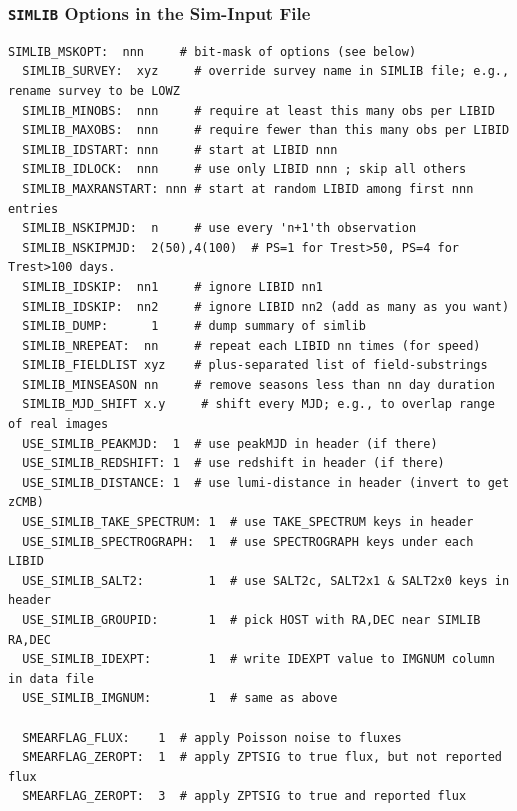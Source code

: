 \documentclass[12pt]{article}
\newcommand{\simlib}{{\tt SIMLIB}}
\begin{document}
{%
\clearpage
\subsubsection{{\simlib} Options in the Sim-Input File}
\label{sssec:simlib_options}

\begin{Verbatim}[frame=single]
  SIMLIB_MSKOPT:  nnn     # bit-mask of options (see below)
  SIMLIB_SURVEY:  xyz     # override survey name in SIMLIB file; e.g., rename survey to be LOWZ
  SIMLIB_MINOBS:  nnn     # require at least this many obs per LIBID
  SIMLIB_MAXOBS:  nnn     # require fewer than this many obs per LIBID
  SIMLIB_IDSTART: nnn     # start at LIBID nnn
  SIMLIB_IDLOCK:  nnn     # use only LIBID nnn ; skip all others
  SIMLIB_MAXRANSTART: nnn # start at random LIBID among first nnn entries
  SIMLIB_NSKIPMJD:  n     # use every 'n+1'th observation
  SIMLIB_NSKIPMJD:  2(50),4(100)  # PS=1 for Trest>50, PS=4 for Trest>100 days.
  SIMLIB_IDSKIP:  nn1     # ignore LIBID nn1
  SIMLIB_IDSKIP:  nn2     # ignore LIBID nn2 (add as many as you want)  
  SIMLIB_DUMP:      1     # dump summary of simlib 
  SIMLIB_NREPEAT:  nn     # repeat each LIBID nn times (for speed)
  SIMLIB_FIELDLIST xyz    # plus-separated list of field-substrings
  SIMLIB_MINSEASON nn     # remove seasons less than nn day duration
  SIMLIB_MJD_SHIFT x.y     # shift every MJD; e.g., to overlap range of real images
  USE_SIMLIB_PEAKMJD:  1  # use peakMJD in header (if there)
  USE_SIMLIB_REDSHIFT: 1  # use redshift in header (if there)
  USE_SIMLIB_DISTANCE: 1  # use lumi-distance in header (invert to get zCMB)
  USE_SIMLIB_TAKE_SPECTRUM: 1  # use TAKE_SPECTRUM keys in header 
  USE_SIMLIB_SPECTROGRAPH:  1  # use SPECTROGRAPH keys under each LIBID
  USE_SIMLIB_SALT2:         1  # use SALT2c, SALT2x1 & SALT2x0 keys in header
  USE_SIMLIB_GROUPID:       1  # pick HOST with RA,DEC near SIMLIB RA,DEC
  USE_SIMLIB_IDEXPT:        1  # write IDEXPT value to IMGNUM column in data file
  USE_SIMLIB_IMGNUM:        1  # same as above 

  SMEARFLAG_FLUX:    1  # apply Poisson noise to fluxes
  SMEARFLAG_ZEROPT:  1  # apply ZPTSIG to true flux, but not reported flux
  SMEARFLAG_ZEROPT:  3  # apply ZPTSIG to true and reported flux
\end{Verbatim}

}
\end{document}
